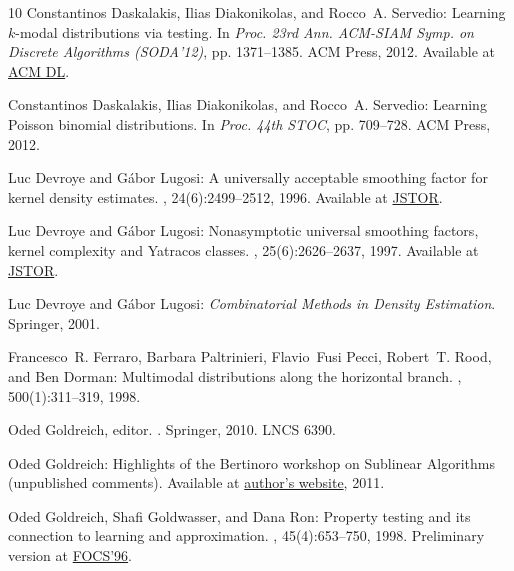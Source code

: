 \begin{thebibliography}{10}
{\sc Constantinos Daskalakis, Ilias Diakonikolas, and Rocco~A. Servedio}:
  Learning $k$-modal distributions via testing.
\newblock In {\em Proc. 23rd Ann. ACM-SIAM Symp. on Discrete Algorithms
  (SODA'12)}, pp. 1371--1385. ACM Press, 2012.
\newblock Available at \href{http://dl.acm.org/citation.cfm?id=2095224}{ACM
  DL}.

{\sc Constantinos Daskalakis, Ilias Diakonikolas, and Rocco~A. Servedio}:
  Learning {P}oisson binomial distributions.
\newblock In {\em Proc. 44th STOC}, pp. 709--728. ACM Press, 2012.

{\sc Luc Devroye and G{\'a}bor Lugosi}: A universally acceptable smoothing
  factor for kernel density estimates.
, 24(6):2499--2512, 1996.
\newblock Available at \href{http://www.jstor.org/stable/2242694}{JSTOR}.

{\sc Luc Devroye and G{\'a}bor Lugosi}: Nonasymptotic universal smoothing
  factors, kernel complexity and {Y}atracos classes.
, 25(6):2626--2637, 1997.
\newblock Available at \href{http://www.jstor.org/stable/2959048}{JSTOR}.

{\sc Luc Devroye and G{\'a}bor Lugosi}: {\em Combinatorial Methods in Density
  Estimation}.
\newblock Springer, 2001.

{\sc Francesco~R. Ferraro, Barbara Paltrinieri, Flavio~Fusi Pecci, Robert~T.
  Rood, and Ben Dorman}: Multimodal distributions along the horizontal branch.
, 500(1):311--319, 1998.
\newblock [\epfmtdoi{10.1086/305712}]

{\sc Oded Goldreich}, editor.
.
\newblock Springer, 2010.
\newblock LNCS 6390.

{\sc Oded Goldreich}: {Highlights of the Bertinoro workshop on Sublinear
  Algorithms (unpublished comments)}.
\newblock Available at
  \href{http://www.wisdom.weizmann.ac.il/\~oded/MC/072.html}{author's website},
  2011.

{\sc Oded Goldreich, Shafi Goldwasser, and Dana Ron}: Property testing and its
  connection to learning and approximation.
, 45(4):653--750, 1998.
\newblock Preliminary version at
  \href{http://dx.doi.org/10.1109/SFCS.1996.548493}{FOCS'96}.
\newblock [\epfmtdoi{10.1145/285055.285060}]


\end{thebibliography}
